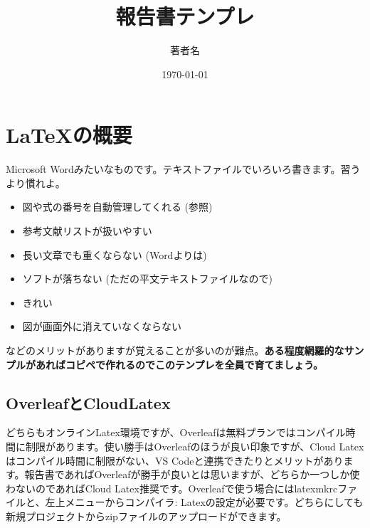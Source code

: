 \documentclass[uplatex,dvipdfmx,a4j,12pt,twocolumn]{jsarticle}
\title{報告書テンプレ}
\author{著者名}
\date{\today}
\begin{document}
\twocolumn[\maketitle]

\section{\LaTeX の概要}
Microsoft Wordみたいなものです。テキストファイルでいろいろ書きます。習うより慣れよ。
\begin{itemize}
    \item 図や式の番号を自動管理してくれる (参照)
    \item 参考文献リストが扱いやすい
    \item 長い文章でも重くならない (Wordよりは)
    \item ソフトが落ちない (ただの平文テキストファイルなので)
    \item きれい
    \item 図が画面外に消えていなくならない
\end{itemize}
などのメリットがありますが覚えることが多いのが難点。\textbf{ある程度網羅的なサンプルがあればコピペで作れるのでこのテンプレを全員で育てましょう。}

\subsection{OverleafとCloudLatex}
どちらもオンラインLatex環境ですが、Overleafは無料プランではコンパイル時間に制限があります。使い勝手はOverleafのほうが良い印象ですが、Cloud Latexはコンパイル時間に制限がない、VS Codeと連携できたりとメリットがあります。報告書であればOverleafが勝手が良いとは思いますが、どちらか一つしか使わないのであればCloud Latex推奨です。Overleafで使う場合にはlatexmkrcファイルと、左上メニューからコンパイラ: Latexの設定が必要です。どちらにしても新規プロジェクトからzipファイルのアップロードができます。
\end{document}
